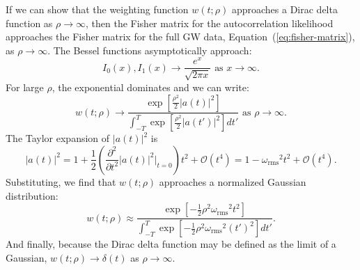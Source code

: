 \documentclass[amsmath,amssymb,aps,prx,reprint,nopreprintnumbers,nofootinbib]{revtex4-1}
\begin{document}
If we can show that the weighting function $w(t; \rho)$ approaches a Dirac delta function as $\rho \rightarrow \infty$, then the Fisher matrix for the autocorrelation likelihood approaches the Fisher matrix for the full GW data, Equation~(\ref{eq:fisher-matrix}), as $\rho \rightarrow \infty$. The Bessel functions asymptotically approach:
%
\begin{equation*}
    I_0(x), I_1(x) \rightarrow \frac{e^x}{\sqrt{2 \pi x}}
    \textrm{ as } x \rightarrow \infty.
\end{equation*}
%
For large $\rho$, the exponential dominates and we can write:
%
\begin{equation*}
    w(t; \rho) \rightarrow \frac{
        \displaystyle
        \exp\left[\frac{\rho^2}{2}|a(t)|^2\right]
    }{
        \displaystyle
        \int_{-T}^T \exp\left[\frac{\rho^2}{2}|a(t')|^2\right] dt'
    }
    \textrm{ as } \rho \rightarrow \infty.
\end{equation*}
%
The Taylor expansion of $|a(t)|^2$ is
%
\begin{equation*}
    |a(t)|^2 = 1 + \frac{1}{2} \left(\frac{\partial^2}{\partial t^2}|a(t)|^2 \Bigg|_{t=0}\right) t^2 + \mathcal{O}(t^4)
    = 1 - {\omega_\mathrm{rms}}^2 t^2 + \mathcal{O}(t^4).
\end{equation*}
%
Substituting, we find that $w(t; \rho)$ approaches a normalized Gaussian distribution:
%
\begin{equation*}
    w(t; \rho) \approx \frac{
        \displaystyle
        \exp\left[-\frac{1}{2} \rho^2 {\omega_\mathrm{rms}}^2 t^2\right]
    }{
        \displaystyle
        \int_{-T}^T \exp\left[-\frac{1}{2} \rho^2 {\omega_\mathrm{rms}}^2 (t')^2\right] dt'
    }.
\end{equation*}
%
And finally, because the Dirac delta function may be defined as the limit of a Gaussian, $w(t; \rho) \rightarrow \delta(t)$ as $\rho \rightarrow \infty$.
\end{document}
